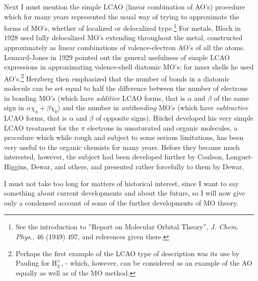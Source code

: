 \documentclass[11pt]{memoir}
\begin{document}
Next I must mention the simple LCAO (linear combination of AO's) procedure which for many years represented the usual way of trying to approximate the forms of MO's, whether of localized or delocalized type.\footnote{See the introduction to ''Report on Molecular Orbital Theory'', \emph{J. Chem. Phys.}, 46 (1949) 497, and references given there.} For metals, Bloch in 1928 used fully delocalized MO's extending throughout the metal, constructed approximately as linear combinations of valence-electron AO's of all the atoms.  Lennard-Jones in 1929 pointed out the general usefulness of simple LCAO expressions in approximating valence-shell diatomic MO's; for inner shells he used AO's.\footnote{Perhaps the first example of the LCAO type of description was its use by Pauling for $\mathrm{H_2^+}$, - which, however, can be considered as an example of the AO equally as well as of the MO method.}  Herzberg then emphasized that the number of bonds in a diatomic molecule can be set equal to half the difference between the number of electrons in bonding MO's (which have \emph{additive} LCAO forms, that is $\alpha$ and $\beta$ of the same sign in $\alpha \chi _a + \beta \chi _b $) and the number in \emph{antibonding} MO's (which have \emph{subtractive} LCAO forms, that is $\alpha$ and $\beta$ of opposite signs).  H\"{u}ckel developed his very simple LCAO treatment for the $\pi$ electrons in unsaturated and organic molecules, a procedure which while rough and subject to some serious limitations, has been very useful to the organic chemists for many years.  Before they became much interested, however, the subject had been developed further by Coulson, Longuet-Higgins, Dewar, and others, and presented rather forcefully to them by Dewar.

I must not take too long for matters of historical interest, since I want to say something about current developments and about the future, so I will now give only a condensed account of some of the further developments of MO theory.
\end{document}
